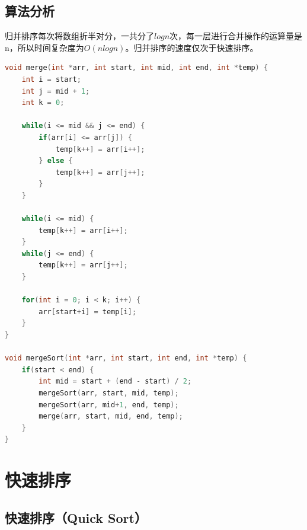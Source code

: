 \vspace{0.5cm}

\subsection{算法分析}

归并排序每次将数组折半对分，一共分了$ logn $次，每一层进行合并操作的运算量是n，所以时间复杂度为$ O(nlogn) $。归并排序的速度仅次于快速排序。\\

\begin{table}[H]
	\centering
	\caption{归并排序算法分析}
\end{table}


\begin{lstlisting}[language=C]
void merge(int *arr, int start, int mid, int end, int *temp) {
    int i = start;
    int j = mid + 1;
    int k = 0;

    while(i <= mid && j <= end) {
        if(arr[i] <= arr[j]) {
            temp[k++] = arr[i++];
        } else {
            temp[k++] = arr[j++];
        }
    }

    while(i <= mid) {
        temp[k++] = arr[i++];
    }
    while(j <= end) {
        temp[k++] = arr[j++];
    }

    for(int i = 0; i < k; i++) {
        arr[start+i] = temp[i];
    }
}

void mergeSort(int *arr, int start, int end, int *temp) {
    if(start < end) {
        int mid = start + (end - start) / 2;
        mergeSort(arr, start, mid, temp);
        mergeSort(arr, mid+1, end, temp);
        merge(arr, start, mid, end, temp);
    }
}
\end{lstlisting}

\newpage

\section{快速排序}

\subsection{快速排序（Quick Sort）}

